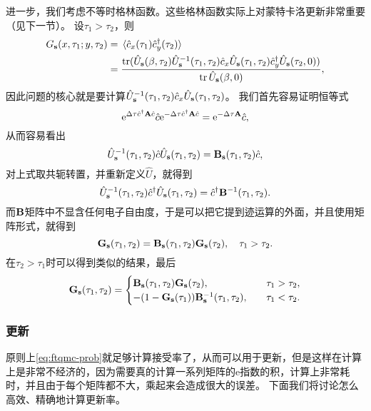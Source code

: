 \documentclass[hyperref, UTF8, a4paper]{ctexart}
\newcommand*{\ee}{\mathrm{e}}
\begin{document}
进一步，我们考虑不等时格林函数。这些格林函数实际上对蒙特卡洛更新非常重要（见下一节）。
设$\tau_1 > \tau_2$，则
\[
    \begin{aligned}
        G_{\vb{s}}(x, \tau_1; y, \tau_2) &= \expval*{\hat{c}_x(\tau_1) \hat{c}^\dagger_y(\tau_2)} \\
        &= \frac{\trace (\hat{U}_{\vb{s}}(\beta, \tau_2) \hat{U}_{\vb{s}}^{-1}(\tau_1, \tau_2) \hat{c}_x \hat{U}_{\vb{s}}(\tau_1, \tau_2) \hat{c}_y^\dagger \hat{U}_{\vb{s}}(\tau_2, 0))}{\trace \hat{U}_{\vb{s}}(\beta, 0)},
    \end{aligned}
\]
因此问题的核心就是要计算$\hat{U}_{\vb{s}}^{-1}(\tau_1, \tau_2) \hat{c}_x \hat{U}_{\vb{s}}(\tau_1, \tau_2)$。
我们首先容易证明恒等式
\[
    \ee^{\Delta \tau \hat{c}^\dagger \vb{A} \hat{c}} \hat{c} \ee^{- \Delta \tau \hat{c}^\dagger \vb{A} \hat{c}} = \ee^{- \Delta \tau \vb{A}} \hat{c},
\]
从而容易看出
\[
    \hat{U}_{\vb{s}}^{-1}(\tau_1, \tau_2) \hat{c} \hat{U}_{\vb{s}}(\tau_1, \tau_2) = \vb{B}_{\vb{s}}(\tau_1, \tau_2) \hat{c},
\]
对上式取共轭转置，并重新定义$\hat{U}$，就得到
\[
    \hat{U}_{\vb{s}}^{-1}(\tau_1, \tau_2) \hat{c}^\dagger \hat{U}_{\vb{s}}(\tau_1, \tau_2) = \hat{c}^\dagger \vb{B}^{-1}(\tau_1, \tau_2).
\]
而$\vb{B}$矩阵中不显含任何电子自由度，于是可以把它提到迹运算的外面，并且使用矩阵形式，就得到
\[
    \vb{G}_{\vb{s}}(\tau_1, \tau_2) = \vb{B}_{\vb{s}}(\tau_1, \tau_2) \vb{G}_{\vb{s}}(\tau_2), \quad \tau_1 > \tau_2.
\]
在$\tau_2 > \tau_1$时可以得到类似的结果，最后
\begin{equation}
    \vb{G}_{\vb{s}}(\tau_1, \tau_2) = \begin{cases}
        \vb{B}_{\vb{s}}(\tau_1, \tau_2) \vb{G}_{\vb{s}}(\tau_2), \quad &\tau_1 > \tau_2, \\
        - (1 - \vb{G}_{\vb{s}}(\tau_1)) \vb{B}^{-1}_{\vb{s}}(\tau_1, \tau_2) , \quad &\tau_1 < \tau_2.
    \end{cases}
\end{equation}

\subsubsection{更新}

原则上\eqref{eq:ftqmc-prob}就足够计算接受率了，从而可以用于更新，但是这样在计算上是非常不经济的，因为需要真的计算一系列矩阵的$\ee$指数的积，计算上非常耗时，并且由于每个矩阵都不大，乘起来会造成很大的误差。
下面我们将讨论怎么高效、精确地计算更新率。
\end{document}
